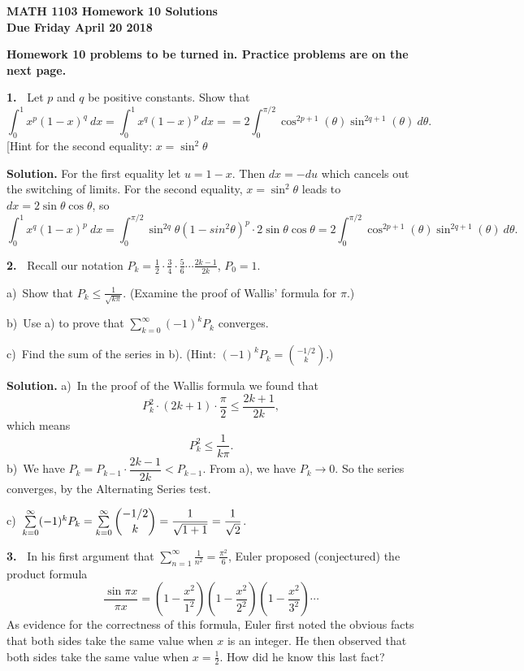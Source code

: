 \documentclass[12pt]{article}
\theoremstyle{definition}
\theoremstyle{remark}
\theoremstyle{definition}
\newenvironment{Solution}{\noindent\textbf{Solution.}}{}
\begin{document}
  

{\bf MATH 1103 Homework 10 Solutions}\\
{\bf Due Friday April 20 2018}



{\bf Homework 10 problems to be turned in. Practice problems are on the next page.}



{\bf 1.\ } Let $p$ and $q$ be positive constants. Show that 
\[
\int_0^1x^p(1-x)^q\ dx=\int_0^1x^q(1-x)^p\ dx=
=2\int_0^{\pi/2}\cos^{2p+1}(\theta)\sin^{2q+1}(\theta)\ d\theta.
\]
[Hint for the second equality: $x=\sin^2\theta$

\begin{Solution} For the first equality let $u=1-x$. Then $dx=-du$ which cancels out the switching of limits. For the second equality, 
$x=\sin^2\theta$ leads to $dx=2\sin\theta\cos\theta$, so 
\[\int_0^1x^q(1-x)^p\ dx=\int_0^{\pi/2}\sin^{2q}\theta(1-sin^2\theta)^p\cdot 2\sin\theta\cos\theta=
2\int_0^{\pi/2}\cos^{2p+1}(\theta)\sin^{2q+1}(\theta)\ d\theta.
\]
\end{Solution} 

{\bf 2.\ } Recall our notation $P_k=\frac{1}{2}\cdot \frac{3}{4}\cdot \frac{5}{6}\cdots\frac{2k-1}{2k}$, $P_0=1$. 

a)\ Show that $P_k\leq\frac{1}{\sqrt{k\pi}}$. (Examine the proof of Wallis' formula for $\pi$.)

b)\ Use a) to prove that $\sum_{k=0}^\infty (-1)^kP_k$ converges. 

c)\ Find the sum of the series in b). (Hint: $(-1)^kP_k=\binom{-1/2}{k}$.)

\begin{Solution} a)\ In the proof of the Wallis formula we found that
\[P_k^2\cdot(2k+1)\cdot \frac{\pi}{2}\leq \frac{2k+1}{2k},\]
which means 
\[P_k^2\leq \frac{1}{k\pi}.\]
b)\ We have $P_k=P_{k-1}\cdot\dfrac{2k-1}{2k}<P_{k-1}$. From a), we have $P_k\to 0$. So the series converges, by the Alternating Series test. 

c)\ 
$\sum\limits_{k=0}^\infty (-1)^kP_k
=\sum\limits_{k=0}^\infty\dbinom{-1/2}{k}=\dfrac{1}{\sqrt{1+1}}=\dfrac{1}{\sqrt{2}}$.

\end{Solution}

{\bf 3.\ }  In his first argument that $\sum\limits_{n=1}^\infty \frac{1}{n^2}=\frac{\pi^2}{6}$, Euler proposed (conjectured) the product formula 
\[ \frac{\sin\pi x}{\pi x}=
\left(1-\frac{x^2}{1^2}\right)\left(1-\frac{x^2}{2^2}\right)
\left(1-\frac{x^2}{3^2}\right)\cdots
\]
As evidence for the correctness of this formula, Euler first noted the obvious facts that both sides take the same value when $x$ is an integer. He then observed that both sides take the same value when $x=\frac{1}{2}$. How did he know this last fact? 
\end{document}
